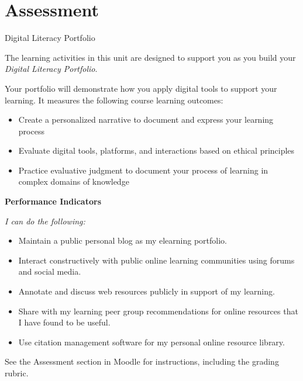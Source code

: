 \documentclass[
]{book}
\providecommand{\tightlist}{%
  \setlength{\itemsep}{0pt}\setlength{\parskip}{0pt}}
\theoremstyle{definition}
\theoremstyle{definition}
\theoremstyle{definition}
\theoremstyle{definition}
\theoremstyle{remark}
\begin{document}
\hypertarget{assessment-3}{%
\section*{Assessment}\label{assessment-3}}

\begin{assessment}
{Digital Literacy Portfolio}

The learning activities in this unit are designed to support you as you build your \emph{Digital Literacy Portfolio}.

Your portfolio will demonstrate how you apply digital tools to support your learning. It measures the following course learning outcomes:

\begin{itemize}
\tightlist
\item
  Create a personalized narrative to document and express your learning process\\
\item
  Evaluate digital tools, platforms, and interactions based on ethical principles\\
\item
  Practice evaluative judgment to document your process of learning in complex domains of knowledge
\end{itemize}

\textbf{Performance Indicators}

\emph{I can do the following:}

\begin{itemize}
\tightlist
\item
  Maintain a public personal blog as my elearning portfolio.\\
\item
  Interact constructively with public online learning communities using forums and social media.\\
\item
  Annotate and discuss web resources publicly in support of my learning.\\
\item
  Share with my learning peer group recommendations for online resources that I have found to be useful.\\
\item
  Use citation management software for my personal online resource library.
\end{itemize}

See the Assessment section in Moodle for instructions, including the grading rubric.
\end{assessment}
\end{document}
